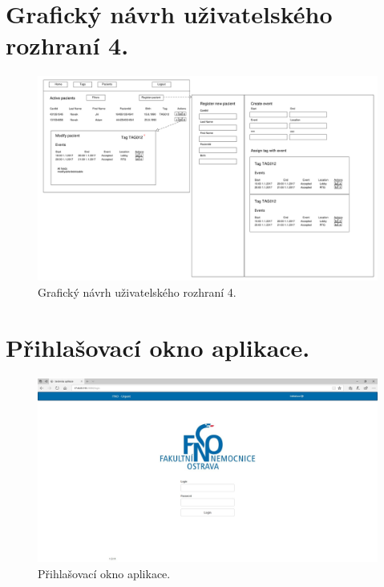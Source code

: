 \documentclass[czech,master,public,dept450,male,oneside, hidelinks]{diploma}
\begin{document}
	\section{Grafický návrh uživatelského rozhraní 4.}
	\begin{figure}[H]
		\centering
		\includegraphics[width=16cm]{Appendix/src/Patients.pdf}
		\caption{Grafický návrh uživatelského rozhraní 4.}
	\end{figure}
	
	\section{Přihlašovací okno aplikace.}
	\begin{figure}[H]
		\centering
		\includegraphics[width=16cm]{Appendix/src/LoginScreen.jpg}
		\caption{Přihlašovací okno aplikace.}
	\end{figure}
	
\end{document}
